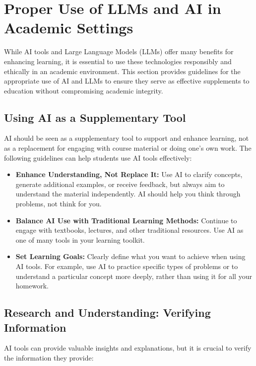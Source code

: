 \documentclass{article}
\begin{document}
\section{Proper Use of LLMs and AI in Academic Settings}

While AI tools and Large Language Models (LLMs) offer many benefits for enhancing learning, it is essential to use these technologies responsibly and ethically in an academic environment. This section provides guidelines for the appropriate use of AI and LLMs to ensure they serve as effective supplements to education without compromising academic integrity.

\subsection{Using AI as a Supplementary Tool}

AI should be seen as a supplementary tool to support and enhance learning, not as a replacement for engaging with course material or doing one's own work. The following guidelines can help students use AI tools effectively:

\begin{itemize}
    \item \textbf{Enhance Understanding, Not Replace It:} Use AI to clarify concepts, generate additional examples, or receive feedback, but always aim to understand the material independently. AI should help you think through problems, not think for you.
    \item \textbf{Balance AI Use with Traditional Learning Methods:} Continue to engage with textbooks, lectures, and other traditional resources. Use AI as one of many tools in your learning toolkit.
    \item \textbf{Set Learning Goals:} Clearly define what you want to achieve when using AI tools. For example, use AI to practice specific types of problems or to understand a particular concept more deeply, rather than using it for all your homework.
\end{itemize}

\subsection{Research and Understanding: Verifying Information}

AI tools can provide valuable insights and explanations, but it is crucial to verify the information they provide:
\end{document}
